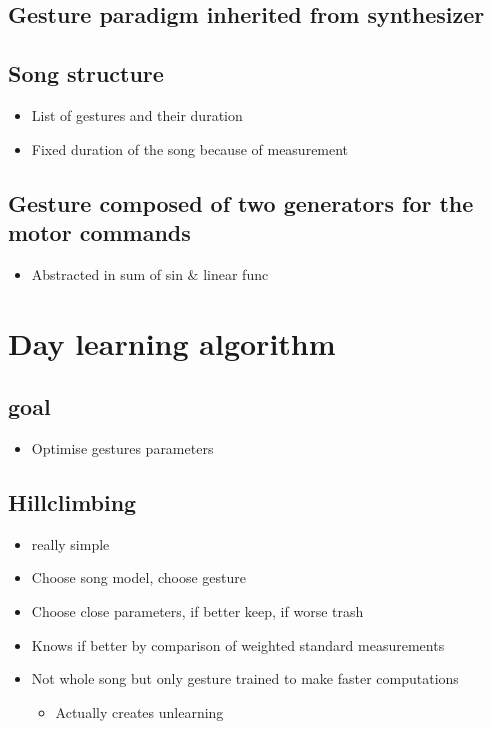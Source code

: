 \subsection{Gesture paradigm inherited from
synthesizer}\label{gesture-paradigm-inherited-from-synthesizer}

\subsection{Song structure}\label{song-structure}

\begin{itemize}
\tightlist
\item
  List of gestures and their duration
\item
  Fixed duration of the song because of measurement
\end{itemize}

\subsection{Gesture composed of two generators for the motor
commands}\label{gesture-composed-of-two-generators-for-the-motor-commands}

\begin{itemize}
\tightlist
\item
  Abstracted in sum of sin \& linear func
\end{itemize}

\section{Day learning algorithm}\label{day-learning-algorithm}

\subsection{goal}\label{goal}

\begin{itemize}
\tightlist
\item
  Optimise gestures parameters
\end{itemize}

\subsection{Hillclimbing}\label{hillclimbing}

\begin{itemize}
\tightlist
\item
  really simple
\item
  Choose song model, choose gesture
\item
  Choose close parameters, if better keep, if worse trash
\item
  Knows if better by comparison of weighted standard measurements
\item
  Not whole song but only gesture trained to make faster computations

  \begin{itemize}
  \tightlist
  \item
    Actually creates unlearning
  \end{itemize}
\end{itemize}

